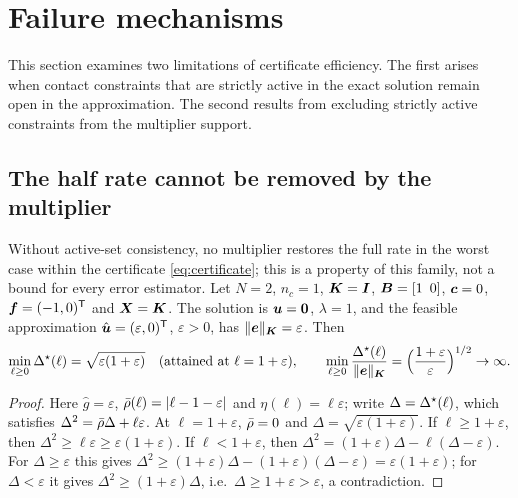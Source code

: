 \section{Failure mechanisms}\label{sec:failure}

This section examines two limitations of certificate efficiency. The first arises when contact constraints that are strictly active in the exact
solution remain open in the approximation. The second results from excluding strictly active constraints from the multiplier support.

\subsection{The half rate cannot be removed by the multiplier}

\begin{proposition}\label{prop:half-rate}
Without active-set consistency, no multiplier restores the full rate in the worst case within the certificate \eqref{eq:certificate}; this is a property of this family, not a bound for every error estimator. Let $N=2$, $n_c=1$, $\boldsymbol{K}=\boldsymbol{I}$,
$\boldsymbol{B}=[1\ \,0]$, $\boldsymbol{c}=0$, $\boldsymbol{f}=(-1,0)^{\mathsf{T}}$ and $\boldsymbol{X}=\boldsymbol{K}$. The solution is $\boldsymbol{u}=\boldsymbol 0$, $\lambda=1$, and the feasible approximation
$\hat{\boldsymbol{u}}=(\varepsilon,0)^{\mathsf{T}}$, $\varepsilon>0$, has $\lVert \boldsymbol{e} \rVert_{\boldsymbol{K}}=\varepsilon$. Then
\begin{equation}\label{eq:half-rate}
  \min_{\ell\ge0}\Delta^{\star}(\ell)=\sqrt{\varepsilon(1+\varepsilon)}\quad(\text{attained at }\ell=1+\varepsilon),\qquad
  \min_{\ell\ge0}\frac{\Delta^{\star}(\ell)}{\lVert \boldsymbol{e} \rVert_{\boldsymbol{K}}}=\Big(\frac{1+\varepsilon}{\varepsilon}\Big)^{1/2}\to\infty .
\end{equation}
\end{proposition}
\begin{proof}
Here $\hat g=\varepsilon$, $\bar{\rho}(\ell)=|\ell-1-\varepsilon|$ and $\eta(\ell)=\ell\varepsilon$; write $\Delta=\Delta^{\star}(\ell)$, which satisfies $\Delta^2=\bar{\rho}\Delta+\ell\varepsilon$. At
$\ell=1+\varepsilon$, $\bar{\rho}=0$ and $\Delta=\sqrt{\varepsilon(1+\varepsilon)}$. If $\ell\ge1+\varepsilon$, then $\Delta^2\ge\ell\varepsilon\ge\varepsilon(1+\varepsilon)$. If $\ell<1+\varepsilon$, then
$\Delta^2=(1+\varepsilon)\Delta-\ell(\Delta-\varepsilon)$. For $\Delta\ge\varepsilon$ this gives $\Delta^2\ge(1+\varepsilon)\Delta-(1+\varepsilon)(\Delta-\varepsilon)=\varepsilon(1+\varepsilon)$; for $\Delta<\varepsilon$ it gives
$\Delta^2\ge(1+\varepsilon)\Delta$, i.e.\ $\Delta\ge1+\varepsilon>\varepsilon$, a contradiction.
\end{proof}

